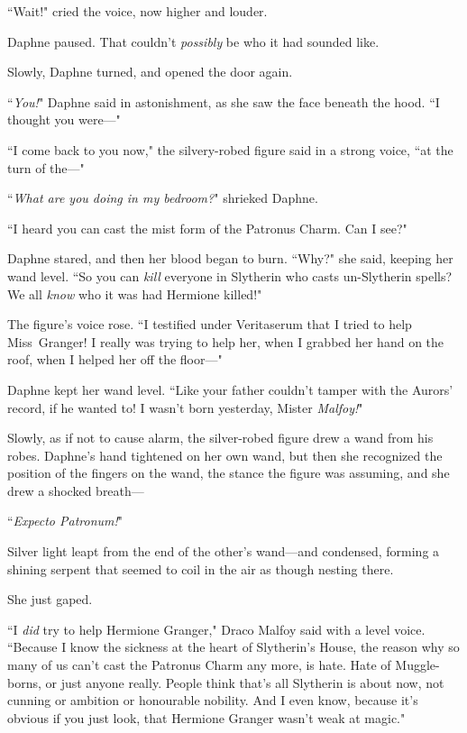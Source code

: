 ``Wait!" cried the voice, now higher and louder.

Daphne paused. That couldn't \emph{possibly} be who it had sounded like.

Slowly, Daphne turned, and opened the door again.

``\emph{You!}" Daphne said in astonishment, as she saw the face beneath the hood. ``I thought you were—"

``I come back to you now," the silvery-robed figure said in a strong voice, ``at the turn of the—"

``\emph{What are you doing in my bedroom?}" shrieked Daphne.

``I heard you can cast the mist form of the Patronus Charm. Can I see?"

Daphne stared, and then her blood began to burn. ``Why?" she said, keeping her wand level. ``So you can \emph{kill} everyone in Slytherin who casts un-Slytherin spells? We all \emph{know} who it was had Hermione killed!"

The figure's voice rose. ``I testified under Veritaserum that I tried to help Miss~Granger! I really was trying to help her, when I grabbed her hand on the roof, when I helped her off the floor—"

Daphne kept her wand level. ``Like your father couldn't tamper with the Aurors' record, if he wanted to! I wasn't born yesterday, Mister \emph{Malfoy!}"

Slowly, as if not to cause alarm, the silver-robed figure drew a wand from his robes. Daphne's hand tightened on her own wand, but then she recognized the position of the fingers on the wand, the stance the figure was assuming, and she drew a shocked breath—

``\emph{Expecto Patronum!}"

Silver light leapt from the end of the other's wand—and condensed, forming a shining serpent that seemed to coil in the air as though nesting there.

She just gaped.

``I \emph{did} try to help Hermione Granger," Draco Malfoy said with a level voice. ``Because I know the sickness at the heart of Slytherin's House, the reason why so many of us can't cast the Patronus Charm any more, is hate. Hate of Muggle-borns, or just anyone really. People think that's all Slytherin is about now, not cunning or ambition or honourable nobility. And I even know, because it's obvious if you just look, that Hermione Granger wasn't weak at magic."

